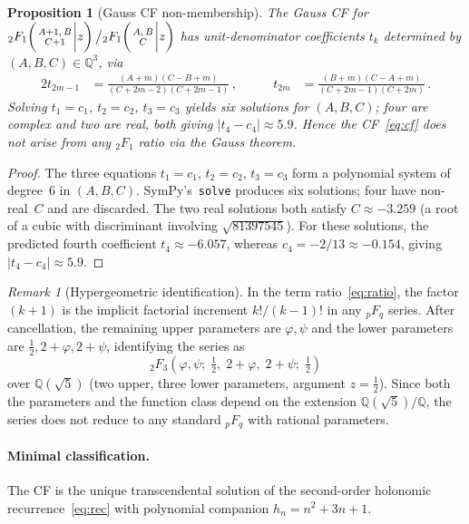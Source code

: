 \documentclass[11pt]{article}
\newcommand{\half}{\tfrac{1}{2}}
\newcommand{\hyp}[5]{{{}_{#1}F_{#2}}\!\left(\genfrac{}{}{0pt}{}{#3}{#4}\bigg|#5\right)}
\newtheorem{proposition}[theorem]{Proposition}
\theoremstyle{remark}
\newtheorem{remark}[theorem]{Remark}
\begin{document}
\begin{proposition}[Gauss CF non-membership]\label{prop:gauss}
The Gauss CF for
$\hyp21{A{+}1,\,B}{C{+}1}{z}\big/\hyp21{A,\,B}{C}{z}$
has unit-denominator coefficients $t_k$ determined by
$(A,B,C)\in\mathbb{Q}^3$, via
\begin{alignat*}{2}
  t_{2m-1} &= \frac{(A{+}m)(C{-}B{+}m)}{(C{+}2m{-}2)(C{+}2m{-}1)}\,,
  &\qquad
  t_{2m} &= \frac{(B{+}m)(C{-}A{+}m)}{(C{+}2m{-}1)(C{+}2m)}\,.
\end{alignat*}
Solving $t_1{=}c_1$, $t_2{=}c_2$, $t_3{=}c_3$ yields six solutions
for $(A,B,C)$; four are complex and two are real, both giving
$|t_4 - c_4| \approx 5.9$.  Hence the CF~\eqref{eq:cf} does not
arise from any ${}_2F_1$ ratio via the Gauss theorem.
\end{proposition}

\begin{proof}
The three equations $t_1 = c_1$, $t_2 = c_2$, $t_3 = c_3$ form
a polynomial system of degree~$6$ in $(A,B,C)$.
SymPy's~\texttt{solve} produces six solutions; four have
non-real~$C$ and are discarded.  The two real solutions both satisfy
$C \approx -3.259$ (a root of a cubic with discriminant involving
$\sqrt{81397545}$).  For these solutions, the predicted fourth coefficient
$t_4 \approx -6.057$, whereas $c_4 = -2/13 \approx -0.154$, giving
$|t_4 - c_4| \approx 5.9$.
\end{proof}

\begin{remark}[Hypergeometric identification]\label{rem:2f3}
In the term ratio~\eqref{eq:ratio}, the factor $(k{+}1)$ is the
implicit factorial increment $k!/(k{-}1)!$ in any ${}_pF_q$ series.
After cancellation, the remaining upper parameters are $\varphi,\psi$
and the lower parameters are $\half, 2{+}\varphi, 2{+}\psi$,
identifying the series as
\[
  {}_2F_3\!\left(\varphi,\psi;\;\half,\;2{+}\varphi,\;2{+}\psi;\;
  \half\right)
\]
over $\mathbb{Q}(\sqrt5)$ (two upper, three lower parameters, argument
$z = \half$).  Since both the parameters and the function class
depend on the extension $\mathbb{Q}(\sqrt5)/\mathbb{Q}$, the series
does not reduce to any standard ${}_pF_q$ with rational parameters.
\end{remark}

\paragraph{Minimal classification.}
The CF is the unique transcendental solution of the
second-order holonomic recurrence~\eqref{eq:rec} with polynomial
companion $h_n = n^2+3n+1$.
\end{document}

